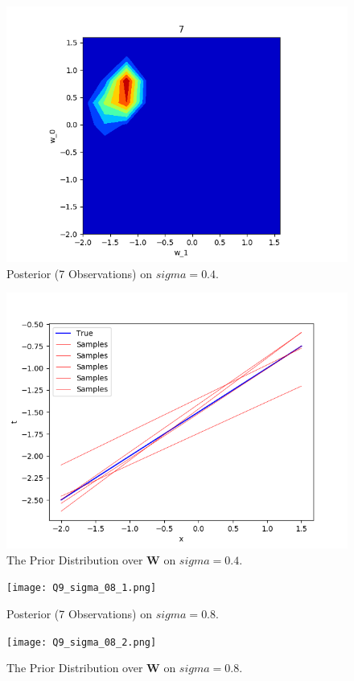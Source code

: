 \documentclass[12pt,letterpaper]{article}
\begin{document}
\begin{figure}[htb]
\centering
\includegraphics[scale =0.3]{Q9_sigma_04_1.png} 
\caption{Posterior (7 Observations) on $sigma = 0.4$.}
\end{figure}
\begin{figure}[htb]
\centering
\includegraphics[scale =0.3]{Q9_sigma_04_2.png} 
\caption{The Prior Distribution over \textbf{W} on $sigma = 0.4$.}
\end{figure}
\begin{figure}[htb]
\centering
\texttt{[image: Q9\_sigma\_08\_1.png]} 
\caption{Posterior (7 Observations) on $sigma = 0.8$.}
\end{figure}
\begin{figure}[htb]
\centering
\texttt{[image: Q9\_sigma\_08\_2.png]} 
\caption{The Prior Distribution over \textbf{W} on $sigma = 0.8$.}
\end{figure}
\end{document}

